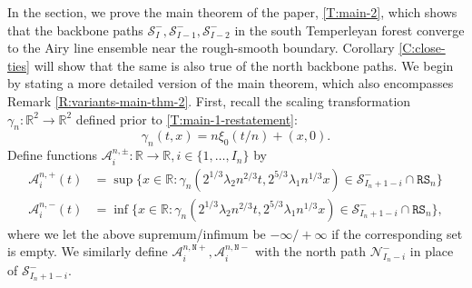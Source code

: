 \documentclass[11pt,twoside]{amsart}
\theoremstyle{plain}
\numberwithin{quest}{section}
\theoremstyle{remark}
\numberwithin{rem}{section}
\theoremstyle{definition}
\newcommand{\R}{\mathbb{R}}
\newcommand{\cA}{\mathcal{A}}
\newcommand{\cS}{\mathcal{S}}
\newcommand{\cN}{\mathcal{N}}
\renewcommand{\tt}[1]{{\mathtt{#1}}}
\begin{document}
	In the section, we prove the main theorem of the paper, \cref{T:main-2}, which shows that the backbone paths $\cS_I^-, \cS_{I-1}^-, \cS_{I-2}^-$ in the south Temperleyan forest converge to the Airy line ensemble near the rough-smooth boundary. Corollary \ref{C:close-ties} will show that the same is also true of the north backbone paths. We begin by stating a more detailed version of the main theorem, which also encompasses Remark \ref{R:variants-main-thm-2}. First, recall the scaling transformation $\gamma_n:\R^2 \to \R^2$ defined prior to \cref{T:main-1-restatement}:
	\begin{equation*}
		\gamma_n(t, x) = n \xi_0(t/n) + (x, 0).
	\end{equation*}
	Define functions $\cA_i^{n, \pm}:\R \to \R, i \in \{1, \dots, I_n\}$ by
	\begin{align*}
		\cA_i^{n, +}(t) &= \sup \{x \in \R : \gamma_n(2^{1/3}\lambda_2 n^{2/3} t, 2^{5/3}\lambda_1 n^{1/3} x) \in \cS_{I_n + 1- i}^- \cap \tt{RS}_n\} \\
		\cA_i^{n, -}(t) &= \inf \{x \in \R : \gamma_n(2^{1/3}\lambda_2 n^{2/3} t, 2^{5/3}\lambda_1 n^{1/3} x) \in \cS_{I_n + 1- i}^- \cap \tt{RS}_n\},
	\end{align*}
	where we let the above supremum/infimum be $-\infty/+\infty$ if the corresponding set is empty. We similarly define $\cA_i^{n, \tt{N}+}, \cA_i^{n, \tt{N}-}$ with the north path $\cN_{I_n - i}^-$ in place of $\cS_{I_n + 1- i}^-$.
	
\end{document}
